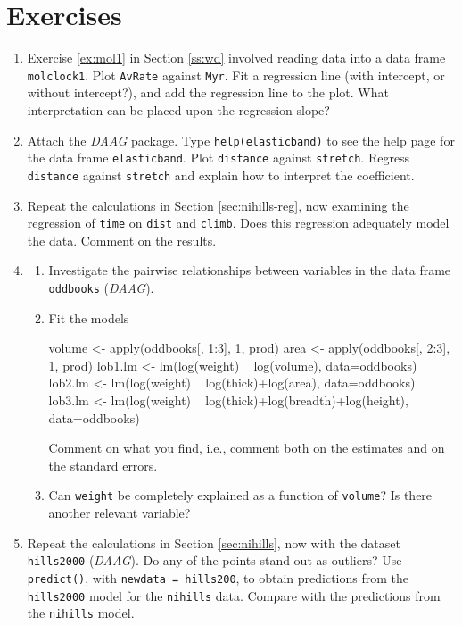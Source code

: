 \documentclass{tufte-book}\usepackage[]{graphicx}\usepackage[]{color}
\newcommand{\txtt}[1]{\texttt{#1}}
\begin{document}
\section{Exercises}
\begin{enumerate}
\item Exercise \ref{ex:mol1} in Section \ref{ss:wd} involved reading
  data into a data frame \txtt{molclock1}.  Plot \txtt{AvRate} against
  \txtt{Myr}. Fit a regression line (with intercept, or without
  intercept?), and add the regression line to the plot.  What
  interpretation can be placed upon the regression
  slope?\label{ex1:mod}

\item  Attach the \textit{DAAG} package. Type
\txtt{help(elasticband)} to see the help page for the data frame
\txtt{elasticband}.  Plot \txtt{distance} against
\txtt{stretch}. Regress \txtt{distance} against
\txtt{stretch} and explain how to interpret the coefficient.
\item Repeat the calculations in Section \ref{sec:nihills-reg}, now
examining the regression of \txtt{time} on \txtt{dist} and \txtt{climb}.
Does this regression adequately model the data. Comment on the results.
\item
\begin{enumerate}
\item Investigate the pairwise relationships between variables in the
data frame \txtt{oddbooks} ({\em DAAG}).
\item Fit the models
  \begin{fullwidth}
\begin{Schunk}
\begin{Sinput}
volume <- apply(oddbooks[, 1:3], 1, prod)
area <- apply(oddbooks[, 2:3], 1, prod)
lob1.lm <- lm(log(weight) ~ log(volume), data=oddbooks)
lob2.lm <- lm(log(weight) ~ log(thick)+log(area), data=oddbooks)
lob3.lm <- lm(log(weight) ~ log(thick)+log(breadth)+log(height),
              data=oddbooks)
\end{Sinput}
\end{Schunk}
\end{fullwidth}
Comment on what you find, i.e., comment both on the estimates and on
the standard errors.
\item Can \txtt{weight} be completely explained as a function of
\txtt{volume}?  Is there another relevant variable?
\end{enumerate}
\item Repeat the calculations in Section \ref{sec:nihills}, now
  with the dataset \txtt{hills2000} (\textit{DAAG}).  Do any of
  the points stand out as outliers?  Use \txtt{predict()},
  with \txtt{newdata = hills200}, to obtain predictions from the
  \txtt{hills2000} model for the \txtt{nihills} data.  Compare with
  the predictions from the \txtt{nihills} model.


\end{enumerate}
\end{document}
